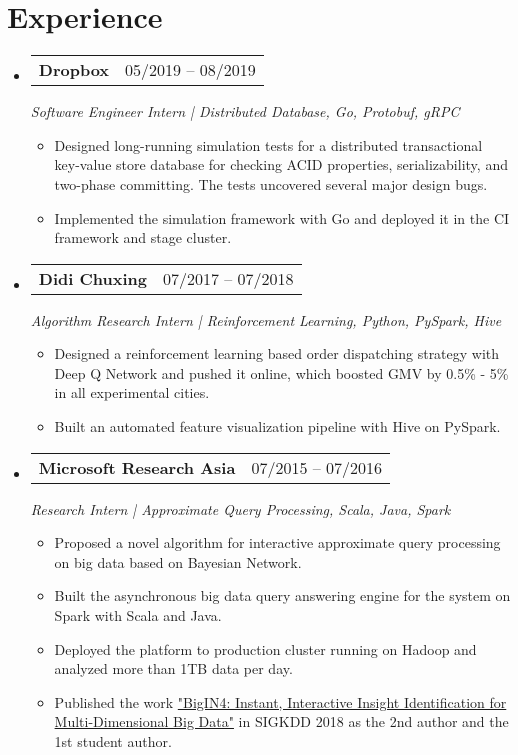 \documentclass[a4paper,11pt]{article}
\makeatletter
\newcommand{\resumeItem}[1]{
  \item\small{#1 \vspace{-2pt}}
}
\newcommand{\resumeSubheading}[3]{
  \vspace{-1pt}\item
    \begin{tabular*}{0.97\textwidth}{l@{\extracolsep{\fill}}r}
      \textbf{#1} & #2
      \end{tabular*}
      \textit{\small#3}
}
\newcommand{\resumeItemListStart}{\begin{itemize}[leftmargin=*, topsep=0ex]}
\newcommand{\resumeItemListEnd}{\end{itemize}}
\makeatother
\begin{document}
\section{Experience}
  \begin{itemize}[leftmargin=*, itemsep=5pt, label={}]

    \resumeSubheading
      {Dropbox}{05/2019 -- 08/2019}
      {Software Engineer Intern | Distributed Database, Go, Protobuf, gRPC}
      \resumeItemListStart
        \resumeItem
        {Designed long-running simulation tests for a distributed transactional key-value store database for checking ACID properties, serializability, and two-phase committing. The tests uncovered several major design bugs.}
        \resumeItem
        {Implemented the simulation framework with Go and deployed it in the CI framework and stage cluster.}
    \resumeItemListEnd

    \resumeSubheading
      {Didi Chuxing}{07/2017 -- 07/2018}
      {Algorithm Research Intern | Reinforcement Learning, Python, PySpark, Hive}
      \resumeItemListStart
        \resumeItem
        {Designed a reinforcement learning based order dispatching strategy with Deep Q Network and pushed it online, which boosted GMV by 0.5\% - 5\% in all experimental cities.}
        \resumeItem
        {Built an automated feature visualization pipeline with Hive on PySpark.}
    \resumeItemListEnd
      
    \resumeSubheading
      {Microsoft Research Asia}{07/2015 -- 07/2016}
      {Research Intern | Approximate Query Processing, Scala, Java, Spark}
      \resumeItemListStart
        \resumeItem
        {Proposed a novel algorithm for interactive approximate query processing on big data based on Bayesian Network.}
        \resumeItem
        {Built the asynchronous big data query answering engine for the system on Spark with Scala and Java.}
        \resumeItem
        {Deployed the platform to production cluster running on Hadoop and analyzed more than 1TB data per day.}
        \resumeItem
        {Published the work \href{http://www.kdd.org/kdd2018/accepted-papers/view/bigin4-instant-interactive-insight-identification-for-multi-dimensional-big}{"BigIN4: Instant, Interactive Insight Identification for Multi-Dimensional Big Data"} in SIGKDD 2018 as the 2nd author and the 1st student author.}
      \resumeItemListEnd
  \end{itemize}
  
\end{document}
